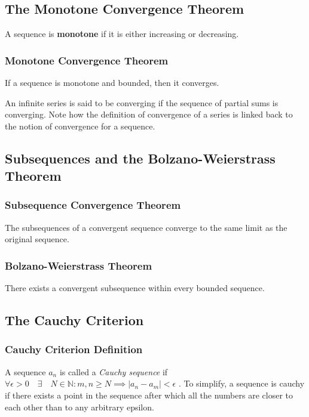 \documentclass{article}
\begin{document}
\subsection{The Monotone Convergence Theorem}

A sequence is \textbf{monotone} if it is either increasing or
decreasing.

\subsubsection{Monotone Convergence Theorem}
If a sequence is monotone and bounded, then it converges.

An infinite series is said to be converging if the sequence of partial
sums is converging. Note how the definition of convergence of a series
is linked back to the notion of convergence for a sequence. 

 
\subsection{Subsequences and the Bolzano-Weierstrass Theorem}

\subsubsection{Subsequence Convergence Theorem}
The subsequences of a convergent sequence converge to the same limit as the original sequence.


\subsubsection{Bolzano-Weierstrass Theorem}
There exists a convergent subsequence within every bounded sequence.



\subsection{The Cauchy Criterion}

\subsubsection{Cauchy Criterion Definition}

A sequence \( a_{n} \) is called a \textit{Cauchy sequence} if \( \forall \epsilon >0 \quad \exists \quad N \in \mathbb{N} : m,n \geq N \implies \left | a_{n} - a_{m}    \right |  < \epsilon  \) . To simplify, a sequence is cauchy if there exists a point in the sequence after which all the numbers are closer to each other than to any arbitrary epsilon.
\end{document}
